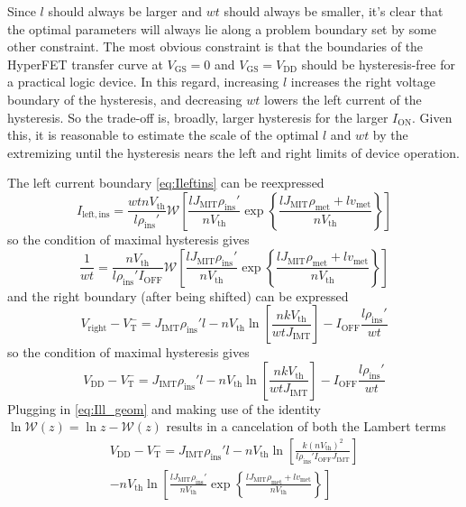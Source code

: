 \documentclass[letterpaper]{article}
\newcommand{\VTm}{\ensuremath{V_\mathrm{T}^-}}
\newcommand{\VDD}{\ensuremath{V_\mathrm{DD}}}
\newcommand{\Vth}{\ensuremath{V_\mathrm{th}}}
\newcommand{\VGS}{\ensuremath{V_\mathrm{GS}}}
\newcommand{\vmet}{\ensuremath{v_\mathrm{met}}}
\newcommand{\IOFF }{\ensuremath{I_\mathrm{OFF}}}
\newcommand{\ION}{\ensuremath{I_\mathrm{ON}}}
\newcommand{\pmet}{\ensuremath{\rho_\mathrm{met}}}
\newcommand{\pinsp}{\ensuremath{\rho_\mathrm{ins}'}}
\begin{document}
Since $l$ should always be larger and $wt$ should always be smaller, it's clear that the optimal parameters will always lie along a problem boundary set by some other constraint.  The most obvious constraint is that the boundaries of the HyperFET transfer curve at $\VGS=0$ and $\VGS=\VDD$ should be hysteresis-free for a practical logic device.  In this regard, increasing $l$ increases the right voltage boundary of the hysteresis, and decreasing $wt$ lowers the left current of the hysteresis.  So the trade-off is, broadly, larger hysteresis for the larger \ION.  Given this, it is reasonable to estimate the scale of the optimal $l$ and $wt$ by the extremizing until the hysteresis nears the left and right limits of device operation.

The left current boundary \eqref{eq:Ileftins} can be reexpressed
\begin{equation}
  I_\mathrm{left, ins}=\frac{wtn\Vth}{l\pinsp}\mathcal{W}\left[ \frac{lJ_\mathrm{MIT}\pinsp}{n\Vth}\exp\left\{ \frac{lJ_\mathrm{MIT}\pmet+l\vmet}{n\Vth} \right\} \right]
  \label{eq:Ill_geom}
\end{equation}
so the condition of maximal hysteresis gives
\begin{equation}
  \frac{1}{wt}=\frac{n\Vth}{l\pinsp\IOFF}\mathcal{W}\left[ \frac{lJ_\mathrm{MIT}\pinsp}{n\Vth}\exp\left\{ \frac{lJ_\mathrm{MIT}\pmet+l\vmet}{n\Vth} \right\} \right]
  \label{eq:Ill_geom_ext}
\end{equation}
and the right boundary (after being shifted) can be expressed
\begin{equation}
  V_\mathrm{right}-\VTm=J_\mathrm{IMT}\pinsp l-n\Vth \ln\left[ \frac{nk\Vth}{wtJ_\mathrm{IMT}} \right]-\IOFF \frac{l\pinsp }{wt}
  \label{eq:Vright_geom}
\end{equation}
so the condition of maximal hysteresis gives
\begin{equation}
  V_\mathrm{DD}-\VTm=J_\mathrm{IMT}\pinsp l-n\Vth \ln\left[ \frac{nk\Vth}{wtJ_\mathrm{IMT}} \right]-\IOFF \frac{l\pinsp }{wt}
  \label{eq:Vright_geom_ext}
\end{equation}
Plugging in \eqref{eq:Ill_geom} and making use of the identity $\ln\mathcal{W}(z)=\ln z- \mathcal{W}(z)$ results in a cancelation of both the Lambert terms
\begin{multline*}
  V_\mathrm{DD}-\VTm=J_\mathrm{IMT}\pinsp l-n\Vth \ln\left[ \frac{k(n\Vth)^2}{l\pinsp \IOFF J_\mathrm{IMT}} \right]\\
  -n\Vth\ln\left[ \frac{lJ_\mathrm{MIT}\pinsp}{n\Vth}\exp\left\{ \frac{lJ_\mathrm{MIT}\pmet+l\vmet}{n\Vth} \right\} \right]
\end{multline*}
\end{document}
